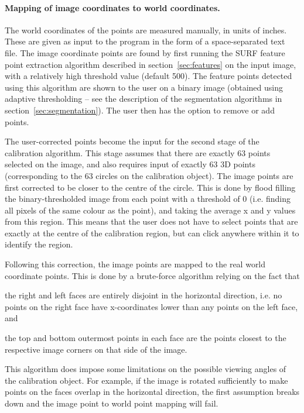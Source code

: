 \paragraph{Mapping of image coordinates to world coordinates.}
The world coordinates of the points are measured manually, in units of
inches. These are given as input to the program in the form of a
space-separated text file. The image coordinate points are found by
first running the SURF feature point extraction algorithm described in
section~\ref{sec:features} on the input image, with a relatively high
threshold value (default 500). The feature points detected using this
algorithm are shown to the user on a binary image (obtained using
adaptive thresholding -- see the description of the segmentation
algorithms in section~\ref{sec:segmentation}). The user then has the option
to remove or add points.

The user-corrected points become the input for the second stage of the
calibration algorithm. This stage assumes that there are exactly 63
points selected on the image, and also requires input of exactly
63 3D points (corresponding to the 63 circles on the calibration
object). The image points are first corrected to be closer to the
centre of the circle. This is done by flood filling the binary-thresholded image
from each point with a threshold of 0 (i.e. finding all pixels of the
same colour as the point), and taking the average x and y values from
this region. This means that the user does not have to select points
that are exactly at the centre of the calibration region, but can
click anywhere within it to identify the region.

Following this correction, the image points are mapped to the real
world coordinate points. This is done by a brute-force algorithm
relying on the fact that
\begin{inparaenum}[(a)]
  \item the right and left faces are entirely disjoint in the
    horizontal direction, i.e. no points on the right face have
    x-coordinates lower than any points on the left face, and
  \item the top and bottom outermost points in each face are the
    points closest to the respective image corners on that side of the
    image.
\end{inparaenum}
This algorithm does impose some limitations on the possible viewing
angles of the calibration object. For example, if the image is rotated
sufficiently to make points on the faces overlap in the horizontal direction, the
first assumption breaks down and the image point to world point
mapping will fail.

